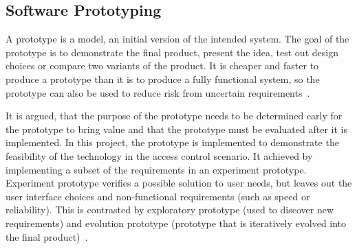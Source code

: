 \subsection{Software Prototyping}\label{sec:methodology-prototype}

A prototype is a model, an initial version of the intended system. The goal of the prototype is to demonstrate the final product, present the idea, test out design choices or compare two variants of the product. It is cheaper and faster to produce a prototype than it is to produce a fully functional system, so the prototype can also be used to reduce risk from uncertain requirements~\cite{Sommerville2011SoftwareEngineering, Davis1995SoftwarePrototyping}.

It is argued, that the purpose of the prototype needs to be determined early for the prototype to bring value and that the prototype must be evaluated after it is implemented. In this project, the prototype is implemented to demonstrate the feasibility of the technology in the access control scenario. It achieved by implementing a subset of the requirements in an experiment prototype. Experiment prototype verifies a possible solution to user needs, but leaves out the user interface choices and non-functional requirements (such as speed or reliability). This is contrasted by exploratory prototype (used to discover new requirements) and evolution prototype (prototype that is iteratively evolved into the final product)~\cite{Davis1995SoftwarePrototyping}.